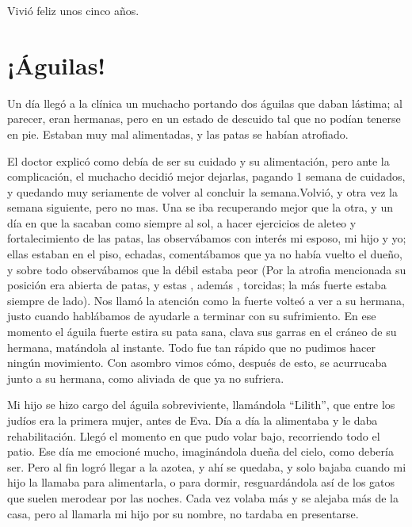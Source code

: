 \documentclass[letterpaper, 12pt]{book}
\begin{document}
Vivió feliz unos cinco años.


\chapter{¡Águilas!}
Un día llegó a la clínica un muchacho portando dos águilas que daban lástima; al parecer, eran hermanas, pero en un estado de descuido tal que no podían tenerse en pie. Estaban muy mal alimentadas, y las patas se habían atrofiado.

El doctor explicó como debía de ser su cuidado y su alimentación, pero ante la complicación, el muchacho decidió mejor dejarlas, pagando 1 semana de cuidados, y quedando muy seriamente de volver al concluir la semana.Volvió, y otra vez la semana siguiente, pero no mas. Una se iba recuperando mejor que la otra, y un día en que la sacaban como siempre al sol, a hacer ejercicios de aleteo y fortalecimiento de las patas, las observábamos con interés mi esposo, mi hijo y yo; ellas estaban en el piso, echadas, comentábamos que ya no había vuelto el dueño, y sobre todo observábamos que la débil estaba peor (Por la atrofia mencionada su posición era abierta de patas, y estas , además , torcidas; la más fuerte estaba siempre de lado). Nos llamó la  atención como la fuerte volteó a ver a su hermana, justo cuando hablábamos de ayudarle a terminar con su sufrimiento. En ese momento el águila fuerte estira su pata sana, clava sus garras en el cráneo de su hermana, matándola al instante. Todo fue tan rápido que no pudimos hacer ningún movimiento. Con asombro vimos cómo, después de esto, se acurrucaba junto a su hermana, como aliviada de que ya no sufriera.

Mi hijo se hizo cargo del águila sobreviviente, llamándola ``Lilith'', que entre los judíos era la primera mujer, antes de Eva. Día a día la alimentaba y le daba rehabilitación. Llegó el momento en que pudo volar bajo, recorriendo todo el patio. Ese día me emocioné mucho, imaginándola dueña del cielo, como debería ser. Pero al fin logró llegar a la azotea, y ahí se quedaba, y solo bajaba cuando mi hijo la llamaba para alimentarla, o para dormir, resguardándola así de los gatos que suelen merodear por las noches. Cada vez volaba más y se alejaba más de la casa, pero al llamarla mi hijo por su nombre, no tardaba en presentarse.
\end{document}
